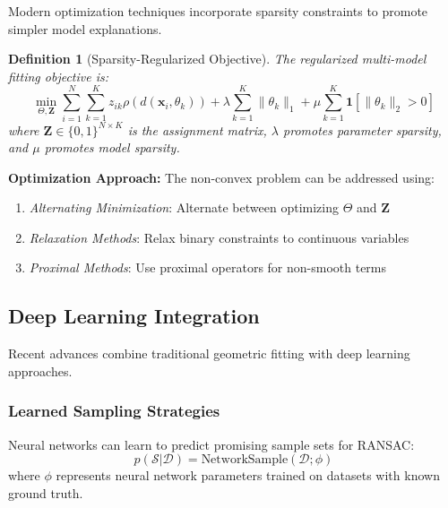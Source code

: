 \documentclass[12pt]{article}
\renewcommand{\vec}[1]{\mathbf{#1}}
\newtheorem{definition}[theorem]{Definition}
\begin{document}
Modern optimization techniques incorporate sparsity constraints to promote simpler model explanations.

\begin{definition}[Sparsity-Regularized Objective]
    \label{def:sparsity_objective}
    The regularized multi-model fitting objective is:
    \begin{equation}
        \min_{\Theta, \mathbf{Z}} \sum_{i=1}^N \sum_{k=1}^K z_{ik} \rho(d(\vec{x}_i, \theta_k)) + \lambda \sum_{k=1}^K \|\theta_k\|_1 + \mu \sum_{k=1}^K \mathbf{1}[\|\theta_k\|_2 > 0]
        \label{eq:sparsity_objective}
    \end{equation}
    where $\mathbf{Z} \in \{0,1\}^{N \times K}$ is the assignment matrix, $\lambda$ promotes parameter sparsity, and $\mu$ promotes model sparsity.
\end{definition}

\textbf{Optimization Approach:} The non-convex problem can be addressed using:
\begin{enumerate}
    \item \textit{Alternating Minimization}: Alternate between optimizing $\Theta$ and $\mathbf{Z}$
    \item \textit{Relaxation Methods}: Relax binary constraints to continuous variables
    \item \textit{Proximal Methods}: Use proximal operators for non-smooth terms
\end{enumerate}

\subsection{Deep Learning Integration}
\label{subsec:deep_learning_integration}

Recent advances combine traditional geometric fitting with deep learning approaches.

\subsubsection{Learned Sampling Strategies}
\label{subsubsec:learned_sampling}

Neural networks can learn to predict promising sample sets for RANSAC:
\begin{equation}
    p(\mathcal{S} | \mathcal{D}) = \text{NetworkSample}(\mathcal{D}; \phi)
    \label{eq:learned_sampling}
\end{equation}
where $\phi$ represents neural network parameters trained on datasets with known ground truth.
\end{document}
